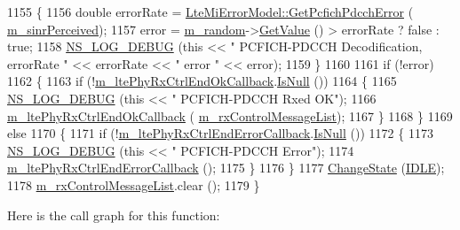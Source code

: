 \begin{DoxyCode}
1155     \{
1156       \textcolor{keywordtype}{double}  errorRate = \hyperlink{classns3_1_1LteMiErrorModel_aafb97369cd64898fca6da09d9a881c06}{LteMiErrorModel::GetPcfichPdcchError} (
      \hyperlink{classns3_1_1LteSpectrumPhy_a5b0f6e0a23257ba3d563a39a01413645}{m\_sinrPerceived});
1157       error = \hyperlink{classns3_1_1LteSpectrumPhy_affa72b99789e284a3451dbd8efaa7e54}{m\_random}->\hyperlink{classns3_1_1UniformRandomVariable_a03822d8c86ac51e9aa83bbc73041386b}{GetValue} () > errorRate ? \textcolor{keyword}{false} : \textcolor{keyword}{true};
1158       \hyperlink{group__logging_ga413f1886406d49f59a6a0a89b77b4d0a}{NS\_LOG\_DEBUG} (\textcolor{keyword}{this} << \textcolor{stringliteral}{" PCFICH-PDCCH Decodification, errorRate "} << errorRate << \textcolor{stringliteral}{" error 
      "} << error);
1159     \}
1160 
1161   \textcolor{keywordflow}{if} (!error)
1162     \{
1163       \textcolor{keywordflow}{if} (!\hyperlink{classns3_1_1LteSpectrumPhy_afdc84170299ddcfaa3735907365ecb6d}{m\_ltePhyRxCtrlEndOkCallback}.\hyperlink{classns3_1_1Callback_aa8e27826badbf37f84763f36f70d9b54}{IsNull} ())
1164         \{
1165           \hyperlink{group__logging_ga413f1886406d49f59a6a0a89b77b4d0a}{NS\_LOG\_DEBUG} (\textcolor{keyword}{this} << \textcolor{stringliteral}{" PCFICH-PDCCH Rxed OK"});
1166           \hyperlink{classns3_1_1LteSpectrumPhy_afdc84170299ddcfaa3735907365ecb6d}{m\_ltePhyRxCtrlEndOkCallback} (
      \hyperlink{classns3_1_1LteSpectrumPhy_ad0e520fb4b440e47e9d2b17b3c5fd05d}{m\_rxControlMessageList});
1167         \}
1168     \}
1169   \textcolor{keywordflow}{else}
1170     \{
1171       \textcolor{keywordflow}{if} (!\hyperlink{classns3_1_1LteSpectrumPhy_aedf905bc6cb012fc963df0a3b6059a53}{m\_ltePhyRxCtrlEndErrorCallback}.\hyperlink{classns3_1_1Callback_aa8e27826badbf37f84763f36f70d9b54}{IsNull} ())
1172         \{
1173           \hyperlink{group__logging_ga413f1886406d49f59a6a0a89b77b4d0a}{NS\_LOG\_DEBUG} (\textcolor{keyword}{this} << \textcolor{stringliteral}{" PCFICH-PDCCH Error"});
1174           \hyperlink{classns3_1_1LteSpectrumPhy_aedf905bc6cb012fc963df0a3b6059a53}{m\_ltePhyRxCtrlEndErrorCallback} ();
1175         \}
1176     \}
1177   \hyperlink{classns3_1_1LteSpectrumPhy_a64a105b7c580b3d6dc5cd4b97d1223d9}{ChangeState} (\hyperlink{classns3_1_1LteSpectrumPhy_a52ce2cf9b4846807449c50399f6b8000a2e09524021e98183b06be8afd923a4c2}{IDLE});
1178   \hyperlink{classns3_1_1LteSpectrumPhy_ad0e520fb4b440e47e9d2b17b3c5fd05d}{m\_rxControlMessageList}.clear ();
1179 \}
\end{DoxyCode}


Here is the call graph for this function\+:




